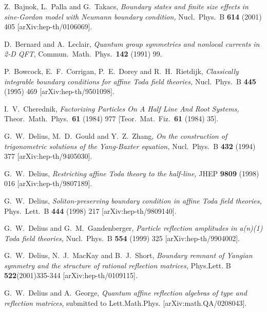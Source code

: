 \documentclass[a4paper,12pt]{article}
\numberwithin{equation}{section}
\begin{document}
\parskip 4pt
\baselineskip 5pt {\small
\begin{thebibliography}{99}
\itemsep 1pt

Z.~Bajnok, L.~Palla and G.~Takacs, \textit{Boundary states and
finite size effects in sine-Gordon model with  Neumann boundary
condition,} Nucl.\ Phys.\ B {\bf 614} (2001) 405
[arXiv:hep-th/0106069].

D.~Bernard and A.~Leclair, \textit{Quantum group symmetries and
nonlocal currents in 2-D QFT}, Commun.\ Math.\ Phys.\  {\bf 142}
(1991) 99.

P.~Bowcock, E.~F.~Corrigan, P.~E.~Dorey and R.~H.~Rietdijk,
\textit{Classically integrable boundary conditions for affine Toda
field theories,} Nucl.\ Phys.\ B {\bf 445} (1995) 469
[arXiv:hep-th/9501098].

I.~V.~Cherednik, \textit{Factorizing Particles On A Half Line And
Root Systems,} Theor.\ Math.\ Phys.\  {\bf 61} (1984) 977 [Teor.\
Mat.\ Fiz.\ {\bf 61} (1984) 35].

G.~W.~Delius, M.~D.~Gould and Y.~Z.~Zhang, \textit{On the
construction of trigonometric solutions of the Yang-Baxter
equation,} Nucl.\ Phys.\ B {\bf 432} (1994) 377
[arXiv:hep-th/9405030].


G.~W.~Delius, \textit{Restricting affine Toda theory to the
half-line,} JHEP {\bf 9809} (1998) 016 [arXiv:hep-th/9807189].

G.~W.~Delius, \textit{Soliton-preserving boundary condition in
affine Toda field theories,}  Phys.\ Lett.\ B {\bf 444} (1998) 217
[arXiv:hep-th/9809140].


G.~W.~Delius and G.~M.~Gandenberger, \textit{Particle reflection
amplitudes in a(n)(1) Toda field theories,} Nucl.\ Phys.\ B {\bf
554} (1999) 325 [arXiv:hep-th/9904002].


G.~W.~Delius, N.~J.~MacKay and B.~J.~Short, \textit{Boundary
remnant of Yangian symmetry and the structure of rational
reflection matrices,} Phys.Lett. B {\bf 522}(2001)335-344
[arXiv:hep-th/0109115].

G.~W.~Delius and A.~George, \textit{Quantum affine reflection
algebras of type \coordHE{} and reflection matrices}, submitted
to Lett.Math.Phys. [arXiv:math.QA/0208043].


\end{thebibliography}}
\end{document}
